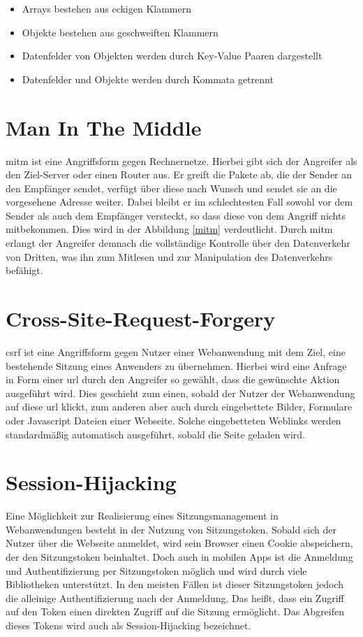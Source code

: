 \begin{itemize}
	\item Arrays bestehen aus eckigen Klammern
	\item Objekte bestehen aus geschweiften Klammern
	\item Datenfelder von Objekten werden durch Key-Value Paaren dargestellt
	\item Datenfelder und Objekte werden durch Kommata getrennt
\end{itemize}

\section{Man In The Middle}
\gls{mitm} ist eine Angriffsform gegen Rechnernetze.
Hierbei gibt sich der Angreifer als den Ziel-Server oder einen Router aus.
Er greift die Pakete ab, die der Sender an den Empfänger sendet, verfügt über diese nach Wunsch und sendet sie an die vorgesehene Adresse weiter. Dabei bleibt er im schlechtesten Fall sowohl vor dem Sender als auch dem Empfänger versteckt, so dass diese von dem Angriff nichts mitbekommen. Dies wird in der Abbildung \ref{mitm} verdeutlicht.
Durch \gls{mitm} erlangt der Angreifer demnach die vollständige Kontrolle über den Datenverkehr von Dritten, was ihn zum Mitlesen und zur Manipulation des Datenverkehrs befähigt.


\clearpage

\section{Cross-Site-Request-Forgery}
\gls{csrf} ist eine Angriffsform gegen Nutzer einer Webanwendung mit dem Ziel, eine bestehende Sitzung eines Anwenders zu übernehmen.
Hierbei wird eine Anfrage in Form einer \gls{url} durch den Angreifer so gewählt, dass die gewünschte Aktion ausgeführt wird.
Dies geschieht zum einen, sobald der Nutzer der Webanwendung auf diese \gls{url} klickt, zum anderen aber auch durch eingebettete Bilder, Formulare oder Javascript Dateien einer Webseite. Solche eingebetteten Weblinks werden standardmäßig automatisch ausgeführt, sobald die Seite geladen wird.

\section{Session-Hijacking}
Eine Möglichkeit zur Realisierung eines Sitzungsmanagement in Webanwendungen besteht in der Nutzung von Sitzungstoken.
Sobald sich der Nutzer über die Webseite anmeldet, wird sein Browser einen Cookie abspeichern, der den Sitzungstoken beinhaltet. Doch auch in mobilen Apps ist die Anmeldung und Authentifizierung per Sitzungstoken möglich und wird durch viele Bibliotheken unterstützt.
In den meisten Fällen ist dieser Sitzungstoken jedoch die alleinige Authentifizierung nach der Anmeldung.
Das heißt, dass ein Zugriff auf den Token einen direkten Zugriff auf die Sitzung ermöglicht.
Das Abgreifen dieses Tokens wird auch als Session-Hijacking bezeichnet.

